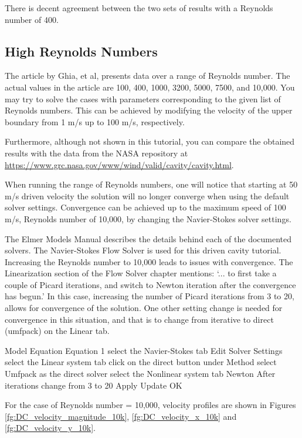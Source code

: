 There is decent agreement between the two sets of results with a Reynolds number of 400.\\

\subsection*{High Reynolds Numbers}

The article by Ghia, et al, presents data over a range of Reynolds number.  The actual values
in the article are 100, 400, 1000, 3200, 5000, 7500, and 10,000.  You may try to solve the cases
with parameters corresponding to the given list of Reynolds numbers.  This can be achieved by
modifying the velocity of the upper boundary from 1 m/s up to 100 m/s, respectively.

Furthermore, although not shown in this tutorial, you can compare the obtained results
with the data from the NASA repository at \url{https://www.grc.nasa.gov/www/wind/valid/cavity/cavity.html}.

When running the range of Reynolds numbers, one will notice that starting at 50 m/s driven
velocity the solution will no longer converge when using the default solver settings.  Convergence
can be achieved up to the maximum speed of 100 m/s, Reynolds number of 10,000, by changing the
Navier-Stokes solver settings.

The Elmer Models Manual describes the details behind each of the documented solvers.
The Navier-Stokes Flow Solver is used for this driven cavity tutorial.  Increasing the Reynolds
number to 10,000 leads to issues with convergence.  The Linearization section of the Flow
Solver chapter mentions: `... to first take a couple of Picard iterations, and
switch to Newton iteration after the convergence has begun.'  In this case, increasing the
number of Picard iterations from 3 to 20, allows for convergence of the solution.
One other setting change is needed for convergence in this situation, and
that is to change from iterative to direct (umfpack) on the Linear tab.


\ttbegin
Model
  Equation
    Equation 1
      select the Navier-Stokes tab
      Edit Solver Settings
      select the Linear system tab
        click on the direct button under Method
        select Umfpack as the direct solver
      select the Nonlinear system tab
      Newton After iterations
        change from 3 to 20
      Apply
    Update
  OK
\ttend

For the case of Reynolds number = 10,000, velocity profiles are shown in Figures \ref{fg:DC_velocity_magnitude_10k}, \ref{fg:DC_velocity_x_10k} and  \ref{fg:DC_velocity_y_10k}.

